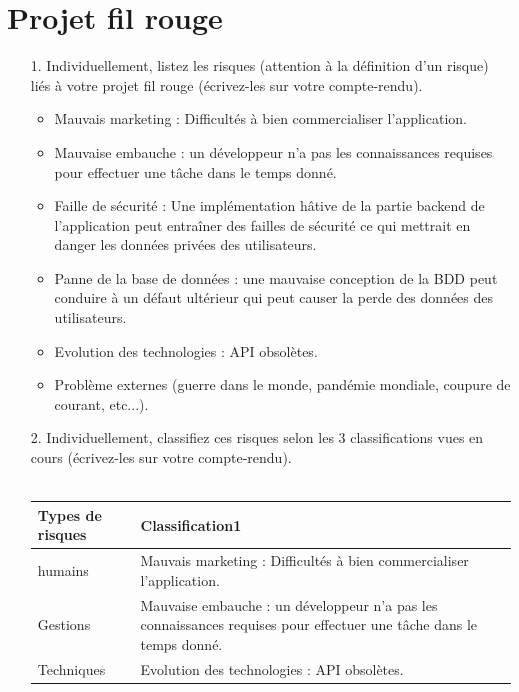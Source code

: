 \documentclass[12pt]{article}
\begin{document}
\begin{itemize}
\begin{itemize}
\begin{itemize}
\begin{figure}[!hbtp]
		\end{figure}
	\end{itemize}
	\end{itemize}
	\end{itemize}
\section{Projet fil rouge}
\begin{itemize}
	\item[1. ] Individuellement, listez les risques (attention à la définition d’un risque) liés à votre projet fil
	rouge (écrivez-les sur votre compte-rendu).\\
	\begin{itemize}
		\item Mauvais marketing : Difficultés à bien commercialiser l’application.
		\item Mauvaise embauche : un développeur n’a pas les connaissances requises pour effectuer une tâche dans le temps donné.
		\item Faille de sécurité : Une implémentation hâtive de la partie backend de l’application peut entraîner des failles de sécurité ce qui mettrait en danger les données privées des utilisateurs.
		\item Panne de la base de données : une mauvaise conception de la BDD peut conduire à un défaut ultérieur qui peut causer la perde des données des utilisateurs.
		\item Evolution des technologies : API obsolètes.
		\item  Problème externes (guerre dans le monde, pandémie mondiale, coupure de courant, etc...).
	\end{itemize}
\item [2. ] Individuellement, classifiez ces risques selon les 3 classifications vues en cours (écrivez-les sur
votre compte-rendu).\\
\\
\begin{tabular}{|p{3.5cm}|p{5cm}|} 
	\hline  
	\centering Types de risques & \raggedright  Classification1 \tabularnewline  
	\hline
	\raggedleft humains&  Mauvais marketing : Difficultés à bien commercialiser l’application. \tabularnewline  
	\hline  
	\raggedleft Gestions & Mauvaise embauche : un développeur n’a pas les connaissances requises  pour effectuer une tâche dans le temps donné. \tabularnewline  
	\hline  
	\raggedleft Techniques & Evolution des technologies : API obsolètes. \tabularnewline 

\end{tabular}
\end{itemize}
\end{document}
